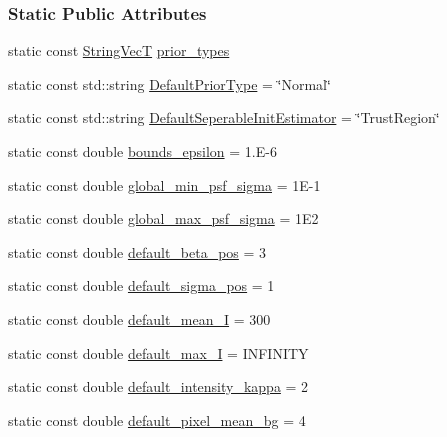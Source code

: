 \subsubsection*{Static Public Attributes}
\begin{DoxyCompactItemize}
\item 
static const \hyperlink{namespacemappel_aae88cf18bccfbb789a6019bcfbbfca68}{String\+VecT} \hyperlink{classmappel_1_1Gauss2DModel_a3bd9cb65f8d41f7b7707e3c4e1299dc2}{prior\+\_\+types}
\item 
static const std\+::string \hyperlink{classmappel_1_1Gauss2DModel_af4b934d290782da4f5f7e8e7e5090a94}{Default\+Prior\+Type} = \char`\"{}Normal\char`\"{}
\item 
static const std\+::string \hyperlink{classmappel_1_1PointEmitterModel_ad8c3dc629d75d22f25855a5f1ba8729f}{Default\+Seperable\+Init\+Estimator} = \char`\"{}Trust\+Region\char`\"{}
\item 
static const double \hyperlink{classmappel_1_1PointEmitterModel_ac987a119137b85a27704b1c40e3fab8c}{bounds\+\_\+epsilon} = 1.\+E-\/6
\item 
static const double \hyperlink{classmappel_1_1PointEmitterModel_a77d0ca98d77cb8b94117ece2a5b182a4}{global\+\_\+min\+\_\+psf\+\_\+sigma} = 1\+E-\/1
\item 
static const double \hyperlink{classmappel_1_1PointEmitterModel_a5e79dba8966c25c4e9c675cd1a2cab70}{global\+\_\+max\+\_\+psf\+\_\+sigma} = 1\+E2
\item 
static const double \hyperlink{classmappel_1_1PointEmitterModel_a9b64c3b4b97ac2805340c0779c71398c}{default\+\_\+beta\+\_\+pos} = 3
\item 
static const double \hyperlink{classmappel_1_1PointEmitterModel_aa98a73b9e3937c00b07596d3928df3ca}{default\+\_\+sigma\+\_\+pos} = 1
\item 
static const double \hyperlink{classmappel_1_1PointEmitterModel_a575dd30a0afb886db82ac725c8cc8df3}{default\+\_\+mean\+\_\+I} = 300
\item 
static const double \hyperlink{classmappel_1_1PointEmitterModel_acca80757a9a285a9e6eedea167d038c7}{default\+\_\+max\+\_\+I} = I\+N\+F\+I\+N\+I\+TY
\item 
static const double \hyperlink{classmappel_1_1PointEmitterModel_ad1f21ed3be543deed3c78a0494cb2984}{default\+\_\+intensity\+\_\+kappa} = 2
\item 
static const double \hyperlink{classmappel_1_1PointEmitterModel_abe82d75be8586234657a61e2f137a6c8}{default\+\_\+pixel\+\_\+mean\+\_\+bg} = 4
\item 

\end{DoxyCompactItemize}
